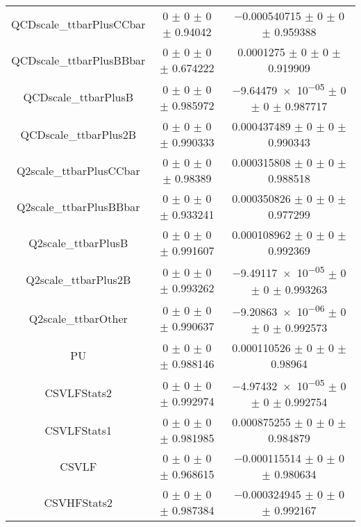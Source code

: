\begin{table}
\begin{tabular}{ccc}
QCDscale\_ttbarPlusCCbar 	& \num{0} $\pm$ \num{0} $\pm$ \num{0} $\pm$ \num{0.94042} 	& \num{-0.000540715} $\pm$ \num{0} $\pm$ \num{0} $\pm$ \num{0.959388}\\
QCDscale\_ttbarPlusBBbar 	& \num{0} $\pm$ \num{0} $\pm$ \num{0} $\pm$ \num{0.674222} 	& \num{0.0001275} $\pm$ \num{0} $\pm$ \num{0} $\pm$ \num{0.919909}\\
QCDscale\_ttbarPlusB 	& \num{0} $\pm$ \num{0} $\pm$ \num{0} $\pm$ \num{0.985972} 	& \num{-9.64479e-05} $\pm$ \num{0} $\pm$ \num{0} $\pm$ \num{0.987717}\\
QCDscale\_ttbarPlus2B 	& \num{0} $\pm$ \num{0} $\pm$ \num{0} $\pm$ \num{0.990333} 	& \num{0.000437489} $\pm$ \num{0} $\pm$ \num{0} $\pm$ \num{0.990343}\\
Q2scale\_ttbarPlusCCbar 	& \num{0} $\pm$ \num{0} $\pm$ \num{0} $\pm$ \num{0.98389} 	& \num{0.000315808} $\pm$ \num{0} $\pm$ \num{0} $\pm$ \num{0.988518}\\
Q2scale\_ttbarPlusBBbar 	& \num{0} $\pm$ \num{0} $\pm$ \num{0} $\pm$ \num{0.933241} 	& \num{0.000350826} $\pm$ \num{0} $\pm$ \num{0} $\pm$ \num{0.977299}\\
Q2scale\_ttbarPlusB 	& \num{0} $\pm$ \num{0} $\pm$ \num{0} $\pm$ \num{0.991607} 	& \num{0.000108962} $\pm$ \num{0} $\pm$ \num{0} $\pm$ \num{0.992369}\\
Q2scale\_ttbarPlus2B 	& \num{0} $\pm$ \num{0} $\pm$ \num{0} $\pm$ \num{0.993262} 	& \num{-9.49117e-05} $\pm$ \num{0} $\pm$ \num{0} $\pm$ \num{0.993263}\\
Q2scale\_ttbarOther 	& \num{0} $\pm$ \num{0} $\pm$ \num{0} $\pm$ \num{0.990637} 	& \num{-9.20863e-06} $\pm$ \num{0} $\pm$ \num{0} $\pm$ \num{0.992573}\\
PU 	& \num{0} $\pm$ \num{0} $\pm$ \num{0} $\pm$ \num{0.988146} 	& \num{0.000110526} $\pm$ \num{0} $\pm$ \num{0} $\pm$ \num{0.98964}\\
CSVLFStats2 	& \num{0} $\pm$ \num{0} $\pm$ \num{0} $\pm$ \num{0.992974} 	& \num{-4.97432e-05} $\pm$ \num{0} $\pm$ \num{0} $\pm$ \num{0.992754}\\
CSVLFStats1 	& \num{0} $\pm$ \num{0} $\pm$ \num{0} $\pm$ \num{0.981985} 	& \num{0.000875255} $\pm$ \num{0} $\pm$ \num{0} $\pm$ \num{0.984879}\\
CSVLF 	& \num{0} $\pm$ \num{0} $\pm$ \num{0} $\pm$ \num{0.968615} 	& \num{-0.000115514} $\pm$ \num{0} $\pm$ \num{0} $\pm$ \num{0.980634}\\
CSVHFStats2 	& \num{0} $\pm$ \num{0} $\pm$ \num{0} $\pm$ \num{0.987384} 	& \num{-0.000324945} $\pm$ \num{0} $\pm$ \num{0} $\pm$ \num{0.992167}\\

\end{tabular}
\end{table}
